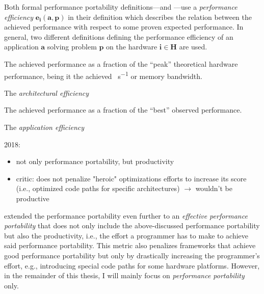 \newpage
Both formal performance portability definitions---\pp and \mpp---use a \textit{performance efficiency} $\mathbf{e_i(a, p)}$ in their definition which describes the relation between the achieved performance with respect to some proven expected performance. 
In general, two different definitions defining the performance efficiency of an application $\mathbf{a}$ solving problem $\mathbf{p}$ on the hardware $\mathbf{i \in H}$ are used. 

\begin{definition}\label{def:arch_eff}
    The achieved performance as a fraction of the \enquote{peak} theoretical hardware performance, being it the achieved \si{\flop\per\second} or memory bandwidth.
\end{definition}

The \textit{architectural efficiency}

\begin{definition}\label{def:app_eff}
    The achieved performance as a fraction of the \enquote{best} observed performance. 
\end{definition}

The \textit{application efficiency}











2018: \cite{harrell_effective_2018}

\begin{itemize}
    \item not only performance portability, but productivity 
    \item critic: \pp does not penalize "heroic" optimizations efforts to increase its score (i.e., optimized code paths for specific architectures) $\rightarrow$ wouldn't be productive
\end{itemize}

\citet{harrell_effective_2018} extended the performance portability even further to an \textit{effective performance portability} that does not only include the above-discussed performance portability but also the productivity, i.e., the effort a programmer has to make to achieve said performance portability. 
This metric also penalizes frameworks that achieve good performance portability but only by drastically increasing the programmer's effort, e.g., introducing special code paths for some hardware platforms. 
However, in the remainder of this thesis, I will mainly focus on \textit{performance portability} only. 


